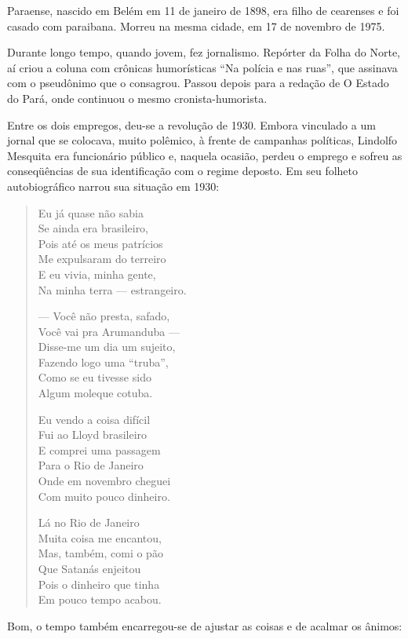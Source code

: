 Paraense, nascido em Belém em 11 de janeiro de 1898, era filho de
cearenses e foi casado com paraibana. Morreu na mesma cidade, em 17
de novembro de 1975.

 Durante longo tempo, quando jovem, fez jornalismo. Repórter da Folha
do Norte, aí criou a coluna com crônicas humorísticas “Na polícia e
nas ruas”, que assinava com o pseudônimo que o consagrou. Passou
depois para a redação de O Estado do Pará, onde continuou o mesmo
cronista-humorista.

Entre os dois empregos, deu-se a revolução de 1930. Embora vinculado a
um jornal que se colocava, muito polêmico, à frente de campanhas
políticas, Lindolfo Mesquita era funcionário público e, naquela
ocasião, perdeu o emprego e sofreu as conseqüências de sua
identificação com o regime deposto. Em seu folheto autobiográfico
narrou sua situação em 1930:
\pagebreak
\begin{verse}
Eu já quase não sabia\\
Se ainda era brasileiro,\\
Pois até os meus patrícios\\
Me expulsaram do terreiro\\
E eu vivia, minha gente, \\
Na minha terra — estrangeiro.

— Você não presta, safado, \\
Você vai pra Arumanduba —\\
Disse-me um dia um sujeito,\\
Fazendo logo uma “truba”,\\
Como se eu tivesse sido\\
Algum moleque cotuba.

Eu vendo a coisa difícil\\
Fui ao Lloyd brasileiro\\
E comprei uma passagem\\
Para o Rio de Janeiro\\
Onde em novembro cheguei\\
Com muito pouco dinheiro.

Lá no Rio de Janeiro\\
Muita coisa me encantou,\\
Mas, também, comi o pão\\
Que Satanás enjeitou\\
Pois o dinheiro que tinha\\
Em pouco tempo acabou.
\end{verse}

Bom, o tempo também encarregou-se de ajustar as coisas e de acalmar os
ânimos:

